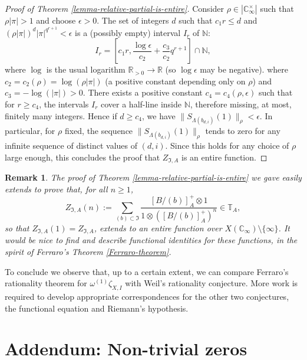 \documentclass[11pt]{amsart}
\numberwithin{equation}{section}
\newcommand{\CC}{\mathbb{C}}
\newcommand{\RR}{\mathbb{R}}
\newcommand{\NN}{\mathbb{N}}
\newcommand{\TT}{\mathbb{T}}
\newtheorem{Remark}[Theorem]{Remark}
\begin{document}
\begin{proof}[Proof of Theorem \ref{lemma-relative-partial-is-entire}]
Consider $\rho\in|\CC_\infty^\times|$ such that $\rho|\pi|>1$ and choose $\epsilon>0$. 
The set of integers $d$ such that $c_1r\leq d$ and $(\rho|\pi|)^d|\pi|^{q^{r+1}}<\epsilon$ is a (possibly empty) interval $I_r$
of $\NN$:
$$I_r=\left[c_1r,\frac{\log\epsilon}{c_2}+\frac{c_3}{c_2}q^{r+1}\right]\cap\NN,$$ where $\log$ is the usual logarithm $\RR_{>0}\rightarrow\RR$ (so $\log\epsilon$ may be negative).
where $c_2=c_2(\rho)=\log(\rho|\pi|)$ (a positive constant depending only on $\rho$) and $c_3=-\log(|\pi|)>0$.
There exists a positive constant $c_4=c_4(\rho,\epsilon)$ such that for $r\geq c_4$, the intervals $I_r$ cover a half-line inside $\NN$, therefore missing, at most, finitely many integers. Hence if $d\geq c_4$, we have $\|S_{\Lambda(b_{d,i})}(1)\|_\rho<\epsilon$. In particular, for $\rho$ fixed, the sequence 
$\|S_{\Lambda(b_{d,i})}(1)\|_\rho$ tends to zero for any infinite sequence of distinct values of $(d,i)$. 
Since this holds for any choice of $\rho$ large enough, this concludes the proof that $Z_{\mathfrak{I},A}$ is an entire function.
\end{proof}

\begin{Remark}
{\em The proof of Theorem \ref{lemma-relative-partial-is-entire} we gave easily extends to prove that, for all $n\geq 1$, 
$$Z_{\mathfrak{I},A}(n):=\sum_{(b)\subset \mathfrak{I}}\frac{[B/(b)]_A^+\otimes1}{1\otimes ([B/(b)]_A^+)^n}\in\TT_A,$$ so that $Z_{\mathfrak{I},A}(1)=Z_{\mathfrak{I},A}$, extends to an entire function over $X(\CC_\infty)\setminus\{\infty\}$. It would be nice to  find and describe functional identities for these functions, in the spirit of Ferraro's Theorem \ref{Ferraro-theorem}.}
\end{Remark}

To conclude we observe that, up to a certain extent, we can compare Ferraro's rationality theorem for $\omega^{(1)}\zeta_{X,I}$ with Weil's rationality conjecture. More work is required to develop appropriate correspondences for the other two conjectures, the functional equation and Riemann's hypothesis. 

\section{Addendum: Non-trivial zeros}
\end{document}
